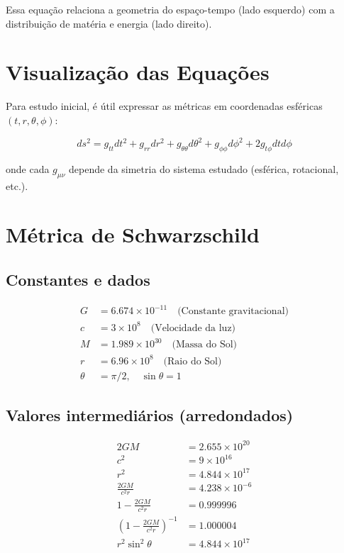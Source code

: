 \documentclass[12pt,a4paper]{article}
\begin{document}
Essa equação relaciona a geometria do espaço-tempo (lado esquerdo) com a distribuição de matéria e energia (lado direito).

\section*{Visualização das Equações}

Para estudo inicial, é útil expressar as métricas em coordenadas esféricas $(t, r, \theta, \phi)$:

\begin{equation}
ds^2 = g_{tt} dt^2 + g_{rr} dr^2 + g_{\theta\theta} d\theta^2 + g_{\phi\phi} d\phi^2 + 2 g_{t\phi} dt d\phi
\end{equation}

\noindent onde cada $g_{\mu\nu}$ depende da simetria do sistema estudado (esférica, rotacional, etc.).


\section{Métrica de Schwarzschild}

\subsection*{Constantes e dados}
\begin{align*}
G &= 6.674\times10^{-11} \quad \text{(Constante gravitacional)}\\
c &= 3\times10^8 \quad \text{(Velocidade da luz)}\\
M &= 1.989\times10^{30} \quad \text{(Massa do Sol)}\\
r &= 6.96\times10^8 \quad \text{(Raio do Sol)}\\
\theta &= \pi/2, \quad \sin\theta = 1
\end{align*}

\subsection*{Valores intermediários (arredondados)}
\begin{align*}
2GM &= 2.655\times10^{20}\\
c^2 &= 9\times10^{16}\\
r^2 &= 4.844\times10^{17}\\
\frac{2GM}{c^2 r} &= 4.238\times10^{-6}\\
1 - \frac{2GM}{c^2 r} &= 0.999996\\
\left(1 - \frac{2GM}{c^2 r}\right)^{-1} &= 1.000004\\
r^2 \sin^2\theta &= 4.844\times10^{17}
\end{align*}
\end{document}
